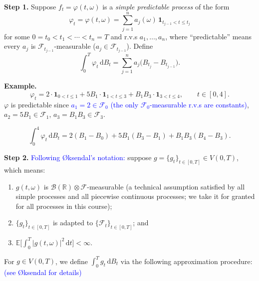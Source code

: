 \documentclass[11pt]{article}
\newcommand{\E}{\mathbb{E}}
\newcommand{\R}{\mathbb{R}}
\newcommand{\F}{\mathcal{F}}
\newcommand{\dd}{\,\mathrm{d}}
\newcommand{\ind}{\mathbf{1}}                 %
\newcommand{\ann}[1]{\textcolor{blue}{#1}}
\theoremstyle{definition}
\begin{document}
\noindent\textbf{Step 1.} Suppose $f_t=\varphi(t,\omega)$ is a \emph{simple predictable process}
of the form
\[
  \varphi_t=\varphi(t,\omega)=\sum_{j=1}^na_j(\omega)\,\ind_{t_{j-1}<t\le t_j}
\]
for some $0=t_0<t_1<\cdots<t_n=T$ and r.v.s $a_1,\ldots,a_n$, where
``predictable'' means every $a_j$ is $\F_{t_{j-1}}$-measurable
($a_j\in\F_{t_{j-1}}$). Define
\[
  \int_0^T\varphi_t\dd B_t=\sum_{j=1}^na_j\bigl(B_{t_j}-B_{t_{j-1}}\bigr).
\]

\smallskip
\noindent\textbf{Example.}
\[
  \varphi_t=2\cdot\ind_{0<t\le1}+5B_1\cdot\ind_{1<t\le3}+B_1B_3\cdot\ind_{3<t\le4},
  \qquad t\in[0,4].
\]
$\varphi$ is predictable since
\ann{$a_1=2\in\F_0$ (the only $\F_0$-measurable r.v.s are constants)}, \;
$a_2=5B_1\in\F_1$, \;
$a_3=B_1B_3\in\F_3$.

\begin{center}
\end{center}

\[
  \int_0^4\varphi_t\dd B_t=2(B_1-B_0)+5B_1(B_3-B_1)+B_1B_3(B_4-B_3).
\]

\medskip
\noindent\textbf{Step 2.} \ann{Following \O ksendal's notation:} suppose
$g=\{g_t\}_{t\in[0,T]}\in V(0,T)$, which means:
\begin{enumerate}
\item[(0)] $g(t,\omega)$ is $\mathcal{B}(\R)\otimes\F$-measurable
      (a technical assumption satisfied by all simple processes and all piecewise
      continuous processes; we take it for granted for all processes in this course);
\item[(1)] $\{g_t\}_{t\in[0,T]}$ is adapted to $\{\F_t\}_{t\in[0,T]}$; and
\item[(2)] $\E\bigl[\int_0^T|g(t,\omega)|^2\dd t\bigr]<\infty$.
\end{enumerate}
For $g\in V(0,T)$, we define $\int_0^Tg_t\dd B_t$ via the following approximation
procedure: \ann{(see \O ksendal for details)}
\end{document}
